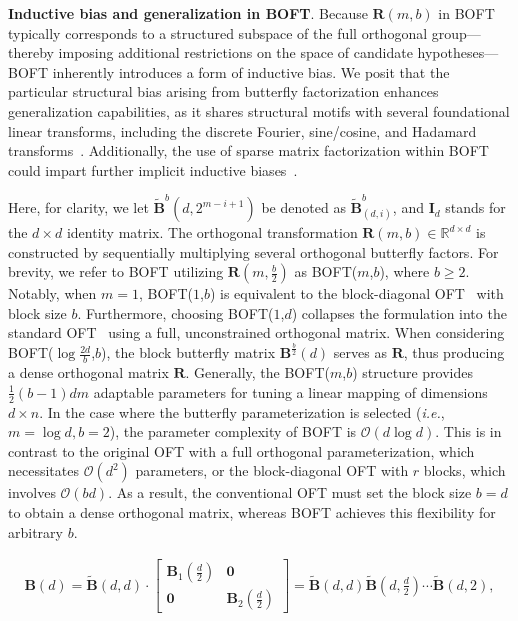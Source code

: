 \textbf{Inductive bias and generalization in BOFT}. Because $\bm{R}(m,b)$ in BOFT typically corresponds to a structured subspace of the full orthogonal group—thereby imposing additional restrictions on the space of candidate hypotheses—BOFT inherently introduces a form of inductive bias. We posit that the particular structural bias arising from butterfly factorization enhances generalization capabilities, as it shares structural motifs with several foundational linear transforms, including the discrete Fourier, sine/cosine, and Hadamard transforms~\cite{dao2019kaleidoscope}. Additionally, the use of sparse matrix factorization within BOFT could impart further implicit inductive biases~\cite{gunasekar2017implicit,li2018algorithmic,liu2019neural}.

Here, for clarity, we let $\tilde{\bm{B}}^b(d,2^{m - i+1})$ be denoted as $\tilde{\bm{B}}^b_{(d,i)}$, and $\bm{I}_d$ stands for the $d \times d$ identity matrix. The orthogonal transformation $\bm{R}(m,b)\in\mathbb{R}^{d\times d}$ is constructed by sequentially multiplying several orthogonal butterfly factors. For brevity, we refer to BOFT utilizing $\bm{R}(m, \frac{b}{2})$ as BOFT($m$,$b$), where $b \geq 2$. Notably, when $m=1$, BOFT($1$,$b$) is equivalent to the block-diagonal OFT~\cite{qiu2023controlling} with block size $b$. Furthermore, choosing BOFT($1$,$d$) collapses the formulation into the standard OFT~\cite{qiu2023controlling} using a full, unconstrained orthogonal matrix. When considering BOFT($\log \frac{2d}{b}$,$b$), the block butterfly matrix $\bm{B}^{\frac{b}{2}}(d)$ serves as $\bm{R}$, thus producing a dense orthogonal matrix $\bm{R}$. Generally, the BOFT($m$,$b$) structure provides $\frac{1}{2}(b-1)dm$ adaptable parameters for tuning a linear mapping of dimensions $d \times n$. In the case where the butterfly parameterization is selected (\emph{i.e.}, $m=\log d, b=2$), the parameter complexity of BOFT is $\mathcal{O}(d\log d)$. This is in contrast to the original OFT with a full orthogonal parameterization, which necessitates $\mathcal{O}(d^2)$ parameters, or the block-diagonal OFT with $r$ blocks, which involves $\mathcal{O}(bd)$. As a result, the conventional OFT must set the block size $b=d$ to obtain a dense orthogonal matrix, whereas BOFT achieves this flexibility for arbitrary $b$.

\begin{equation}
\begin{aligned}
    \!\!\bm{B}(d)=\tilde{\bm{B}}(d,d)\!\cdot\!\begin{bmatrix}
    \bm{B}_1(\frac{d}{2})\!\!\!\!\! & \bm{0} \\
    \bm{0}\!\!\!\!\! &\bm{B}_2(\frac{d}{2})
    \end{bmatrix}= \tilde{\bm{B}}(d,d)\tilde{\bm{B}}(d,\frac{d}{2})\cdots\tilde{\bm{B}}(d,2),
\end{aligned}
\end{equation}

